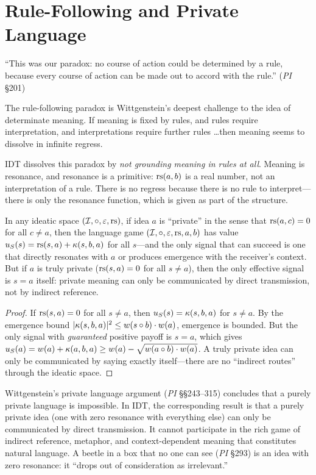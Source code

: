 \section{Rule-Following and Private Language}

``This was our paradox: no course of action could be determined by a rule,
because every course of action can be made out to accord with the rule.''
(\emph{PI} \S201)

The rule-following paradox is Wittgenstein's deepest challenge to the idea of
determinate meaning. If meaning is fixed by rules, and rules require
interpretation, and interpretations require further rules \ldots then meaning
seems to dissolve in infinite regress.

IDT dissolves this paradox by \emph{not grounding meaning in rules at all}.
Meaning is resonance, and resonance is a primitive: $\mathrm{rs}(a, b)$ is a
real number, not an interpretation of a rule. There is no regress because
there is no rule to interpret---there is only the resonance function, which is
given as part of the structure.

\begin{theorem}
\label{thm:no-private-language}
In any ideatic space $(\mathcal{I}, \circ, \varepsilon, \mathrm{rs})$, if idea $a$ is
``private'' in the sense that $\mathrm{rs}(a, c) = 0$ for all $c \neq a$, then
the language game $(\mathcal{I}, \circ, \varepsilon, \mathrm{rs}, a, b)$ has value
$u_S(s) = \mathrm{rs}(s, a) + \kappa(s, b, a)$ for all $s$---and the only signal
that can succeed is one that directly resonates with $a$ or produces emergence
with the receiver's context. But if $a$ is truly private
($\mathrm{rs}(s, a) = 0$ for all $s \neq a$), then the only effective signal is
$s = a$ itself: private meaning can only be communicated by direct
transmission, not by indirect reference.
\end{theorem}

\begin{proof}
If $\mathrm{rs}(s, a) = 0$ for all $s \neq a$, then $u_S(s) = \kappa(s, b, a)$
for $s \neq a$. By the emergence bound
$|\kappa(s, b, a)|^2 \leq w(s \circ b) \cdot w(a)$, emergence is
bounded. But the only signal with \emph{guaranteed} positive payoff is
$s = a$, which gives $u_S(a) = w(a) + \kappa(a, b, a) \geq w(a) - \sqrt{w(a \circ b) \cdot w(a)}$. A truly private idea can only be communicated
by saying exactly itself---there are no ``indirect routes'' through the
ideatic space.
\end{proof}

\begin{interpretation}
Wittgenstein's private language argument (\emph{PI} \S\S243--315) concludes
that a purely private language is impossible. In IDT, the corresponding
result is that a purely private idea (one with zero resonance with everything
else) can only be communicated by direct transmission. It cannot participate
in the rich game of indirect reference, metaphor, and context-dependent
meaning that constitutes natural language. A beetle in a box that no one
can see (\emph{PI} \S293) is an idea with zero resonance: it ``drops out of
consideration as irrelevant.''
\end{interpretation}

